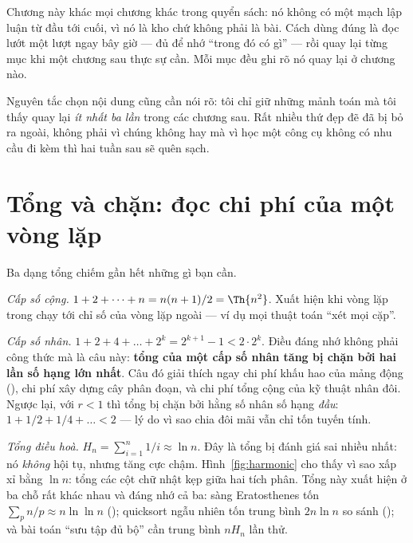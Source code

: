 \documentclass[../../algorithm.tex]{subfiles}
\begin{document}
Chương này khác mọi chương khác trong quyển sách: nó không có một mạch lập luận từ đầu tới cuối, vì nó là kho chứ không phải là bài. Cách dùng đúng là đọc lướt một lượt ngay bây giờ --- đủ để nhớ ``trong đó có gì'' --- rồi quay lại từng mục khi một chương sau thực sự cần. Mỗi mục đều ghi rõ nó quay lại ở chương nào.

Nguyên tắc chọn nội dung cũng cần nói rõ: tôi chỉ giữ những mảnh toán mà tôi thấy quay lại \emph{ít nhất ba lần} trong các chương sau. Rất nhiều thứ đẹp đẽ đã bị bỏ ra ngoài, không phải vì chúng không hay mà vì học một công cụ không có nhu cầu đi kèm thì hai tuần sau sẽ quên sạch.

\section{Tổng và chặn: đọc chi phí của một vòng lặp}

Ba dạng tổng chiếm gần hết những gì bạn cần.

\emph{Cấp số cộng.} \(1+2+\dots+n = n(n+1)/2 = \Th{n^2}\). Xuất hiện khi vòng lặp trong chạy tới chỉ số của vòng lặp ngoài --- ví dụ mọi thuật toán ``xét mọi cặp''.

\emph{Cấp số nhân.} \(1+2+4+\dots+2^k = 2^{k+1}-1 < 2\cdot 2^k\). Điều đáng nhớ không phải công thức mà là câu này: \textbf{tổng của một cấp số nhân tăng bị chặn bởi hai lần số hạng lớn nhất}. Câu đó giải thích ngay chi phí khấu hao của mảng động (), chi phí xây dựng cây phân đoạn, và chi phí tổng cộng của kỹ thuật nhân đôi. Ngược lại, với \(r<1\) thì tổng bị chặn bởi hằng số nhân số hạng \emph{đầu}: \(1 + 1/2 + 1/4 + \dots < 2\) --- lý do vì sao chia đôi mãi vẫn chỉ tốn tuyến tính.

\emph{Tổng điều hoà.} \(H_n = \sum_{i=1}^n 1/i \approx \ln n\). Đây là tổng bị đánh giá sai nhiều nhất: nó \emph{không} hội tụ, nhưng tăng cực chậm. Hình~\ref{fig:harmonic} cho thấy vì sao xấp xỉ bằng \(\ln n\): tổng các cột chữ nhật kẹp giữa hai tích phân. Tổng này xuất hiện ở ba chỗ rất khác nhau và đáng nhớ cả ba: sàng Eratosthenes tốn \(\sum_{p} n/p \approx n\ln\ln n\) (); quicksort ngẫu nhiên tốn trung bình \(2n\ln n\) so sánh (); và bài toán ``sưu tập đủ bộ'' cần trung bình \(nH_n\) lần thử.
\end{document}
